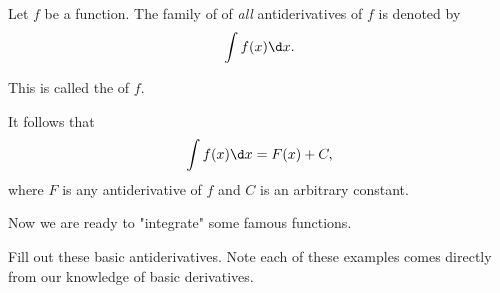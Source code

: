 \documentclass{ximera}
\begin{document}
\begin{definition}
Let $f$ be a function. The family of of \emph{all} antiderivatives of $f$ is denoted by
\[
\int f(x) \d x. 
\]

This is called the
 of $f$.
\end{definition}
It follows that
\[
\int f(x) \d x =F(x)+C,
\]
where $F$ is any antiderivative of $f$ and $C$ is an arbitrary constant.

Now we are ready to "integrate" some famous functions.


Fill out these basic antiderivatives. Note each of these examples comes
directly from our knowledge of basic derivatives.

\end{document}
